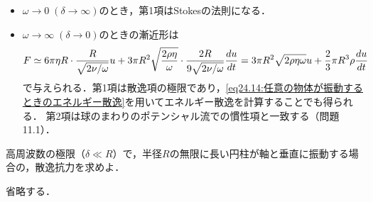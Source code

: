 \begin{kaitou}
\begin{itemize}
    \item $\omega\to 0 \; (\delta\to\infty)$のとき，第1項はStokesの法則になる．
    \item $\omega\to\infty \; (\delta\to 0)$のときの漸近形は
    \[
        F \simeq 6\pi\eta R \cdot \frac{R}{\sqrt{2\nu/\omega}} u 
        + 3\pi R^2 \sqrt{\frac{2\rho\eta}{\omega}}  \cdot \frac{2R}{9\sqrt{2\nu/\omega}} \dv{u}{t}
        = 3\pi R^2 \sqrt{2\rho\eta\omega} u + \frac{2}{3}\pi R^3 \rho \dv{u}{t}
    \]
    で与えられる．第1項は散逸項の極限であり，\eqref{eq24.14:任意の物体が振動するときのエネルギー散逸}を用いてエネルギー散逸を計算することでも得られる．
    第2項は球のまわりのポテンシャル流での慣性項と一致する（問題11.1）．
\end{itemize}


\end{kaitou}





\begin{mondai}{}{}
高周波数の極限（$\delta\ll R$）で，半径$R$の無限に長い円柱が軸と垂直に振動する場合の，散逸抗力を求めよ．
\end{mondai}
\begin{kaitou}
省略する．


\end{kaitou}





